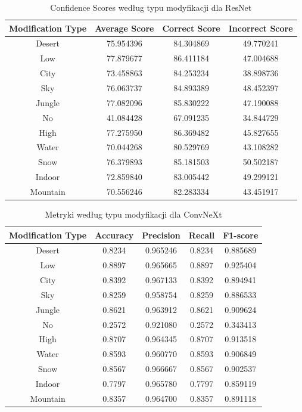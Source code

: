 \begin{table}
	\centering
	\begin{tabular}{|c|c|c|c|}
		\hline
		\textbf{Modification Type} & \textbf{Average Score} & \textbf{Correct Score} & \textbf{Incorrect Score} \\
		\hline
		Desert & 75.954396 & 84.304869 & 49.770241 \\
		\hline
		Low & 77.879677 & 86.411184 & 47.004688 \\
		\hline
		City & 73.458863 & 84.253234 & 38.898736 \\
		\hline
		Sky & 76.063737 & 84.893389 & 48.452397 \\
		\hline
		Jungle & 77.082096 & 85.830222 & 47.190088 \\
		\hline
		No & 41.084428 & 67.091235 & 34.844729 \\
		\hline
		High & 77.275950 & 86.369482 & 45.827655 \\
		\hline
		Water & 70.044268 & 80.529769 & 43.108282 \\
		\hline
		Snow & 76.379893 & 85.181503 & 50.502187 \\
		\hline
		Indoor & 72.859840 & 83.005442 & 49.299121 \\
		\hline
		Mountain & 70.556246 & 82.283334 & 43.451917 \\
		\hline
	\end{tabular}
	\caption{Confidence Scores według typu modyfikacji dla ResNet}
	\label{tab:resnet_confidence_modification}
\end{table}

\begin{table}
	\centering
	\begin{tabular}{|c|c|c|c|c|}
		\hline
		\textbf{Modification Type} & \textbf{Accuracy} & \textbf{Precision} & \textbf{Recall} & \textbf{F1-score} \\
		\hline
		Desert & 0.8234 & 0.965246 & 0.8234 & 0.885689 \\
		\hline
		Low & 0.8897 & 0.965665 & 0.8897 & 0.925404 \\
		\hline
		City & 0.8392 & 0.967133 & 0.8392 & 0.894941 \\
		\hline
		Sky & 0.8259 & 0.958754 & 0.8259 & 0.886533 \\
		\hline
		Jungle & 0.8621 & 0.963912 & 0.8621 & 0.909624 \\
		\hline
		No & 0.2572 & 0.921080 & 0.2572 & 0.343413 \\
		\hline
		High & 0.8707 & 0.964345 & 0.8707 & 0.913518 \\
		\hline
		Water & 0.8593 & 0.960770 & 0.8593 & 0.906849 \\
		\hline
		Snow & 0.8567 & 0.966667 & 0.8567 & 0.902537 \\
		\hline
		Indoor & 0.7797 & 0.965780 & 0.7797 & 0.859119 \\
		\hline
		Mountain & 0.8357 & 0.964700 & 0.8357 & 0.891118 \\
		\hline
	\end{tabular}
	\caption{Metryki według typu modyfikacji dla ConvNeXt}
	\label{tab:convnext_metrics_modification}
\end{table}

